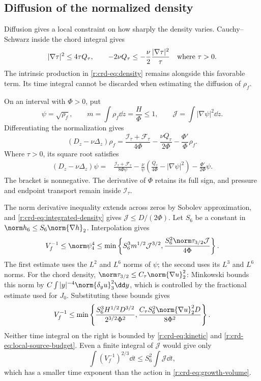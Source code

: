 \subsection{Diffusion of the normalized density}

Diffusion gives a local constraint on how sharply the density varies.
Cauchy--Schwarz inside the chord integral gives
\[
 |\nabla\tau|^2\le4\tau Q_\tau,\qquad
 -2\nu Q_\tau\le-\frac\nu2\frac{|\nabla\tau|^2}{\tau}
 \quad\hbox{where }\tau>0.
\]
The intrinsic production in \eqref{r:crd-eq:density} remains alongside
this favorable term. Its time integral cannot be discarded when estimating
the diffusion of \(\rho_f\).

On an interval with \(\Phi>0\), put
\[
 \psi=\sqrt{\rho_f},\qquad
 m=\int\rho_f\dd z=\frac H\Phi\le1,\qquad
 \mathcal J=\int|\nabla\psi|^2\dd z.
\]
Differentiating the normalization gives
\begin{equation}
 (D_z-\nu\Delta_z)\rho_f
 =\frac{\mathcal I_\tau+\mathcal F_\tau}{4\Phi}
 -\frac{\nu Q_\tau}{2\Phi}
 -\frac{\Phi'}{\Phi}\rho_f.
 \label{r:crd-eq:normalized-density}
\end{equation}
Where \(\tau>0\), its square root satisfies
\begin{equation}
 \begin{aligned}
 (D_z-\nu\Delta_z)\psi
 ={}&\frac{\mathcal I_\tau+\mathcal F_\tau}{8\Phi\psi}
 -\frac{\nu}{\psi}
     \left(\frac{Q_\tau}{4\Phi}-|\nabla\psi|^2\right)
 -\frac{\Phi'}{2\Phi}\psi.
 \end{aligned}
 \label{r:crd-eq:square-root}
\end{equation}
The bracket is nonnegative. The derivative of \(\Phi\) retains its full
sign, and pressure and endpoint transport remain inside \(\mathcal I_\tau\).

The norm derivative inequality extends across zeros by Sobolev approximation,
and \eqref{r:crd-eq:integrated-density} gives
\(\mathcal J\le D/(2\Phi)\).
Let \(S_6\) be a constant in
\(\norm h_6\le S_6\norm{\nabla h}_2\). Interpolation gives
\begin{equation}
 V_f^{-1}\le\norm\psi_4^4
 \le\min\left\{
 S_6^3m^{1/2}\mathcal J^{3/2},
 \frac{S_6^2\norm\tau_{3/2}\mathcal J}{4\Phi}
 \right\}.
 \label{r:crd-eq:density-interpolation}
\end{equation}
The first estimate uses the \(L^2\) and \(L^6\) norms of \(\psi\);
the second uses its \(L^3\) and \(L^6\) norms.
For the chord density,
\(\norm\tau_{3/2}\le C_\tau\norm{\nabla u}_2^2\):
Minkowski bounds this norm by
\(C\int |y|^{-4}\norm{\delta_yu}_3^2\dd y\), which is controlled by
the fractional estimate used for \(J_0\).
Substituting these bounds gives
\begin{equation}
 V_f^{-1}\le\min\left\{
 \frac{S_6^3H^{1/2}D^{3/2}}{2^{3/2}\Phi^2},
 \frac{C_\tau S_6^2\norm{\nabla u}_2^2D}{8\Phi^2}
 \right\}.
 \label{r:crd-eq:inverse-volume}
\end{equation}
Neither time integral on the right is bounded by
\eqref{r:crd-eq:kinetic} and \eqref{r:crd-eq:local-source-budget}.
Even a finite integral of \(\mathcal J\) would give only
\[
 \int(V_f^{-1})^{2/3}\dd t\le S_6^2\int\mathcal J\dd t,
\]
which has a smaller time exponent than the action in
\eqref{r:crd-eq:growth-volume}.

